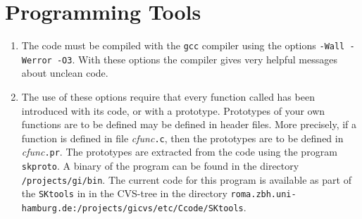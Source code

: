 \documentclass[12pt]{article}
\begin{document}
\section{Programming Tools}
\begin{enumerate}
\item
The code must be compiled with the \texttt{gcc} compiler
using the options \texttt{-Wall -Werror -O3}. With these options the
compiler gives very helpful messages about unclean code.
\item
The use of these options require that every function called has been
introduced with its code, or with a prototype. Prototypes of your
own functions are to be defined may be defined in header files. More
precisely, if a function is defined in file \emph{cfunc}\texttt{.c},
then the prototypes are to be defined in \emph{cfunc}\texttt{.pr}.
The prototypes are extracted from the code using the program
\texttt{skproto}. A binary of the program can be found in the directory 
\texttt{/projects/gi/bin}.
The current code for this program is
available as part of the \texttt{SKtools} in
in the CVS-tree in the directory \texttt{roma.zbh.uni-hamburg.de:/projects/gicvs/etc/Ccode/SKtools}.
\end{enumerate}
\end{document}
